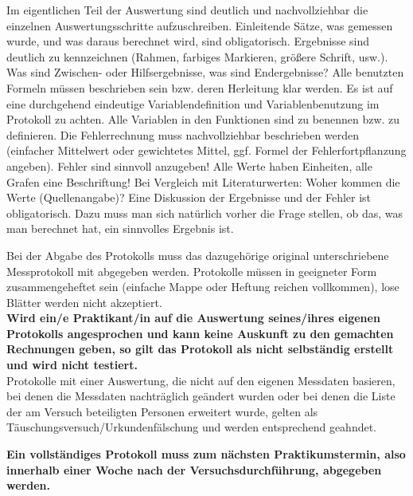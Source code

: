 Im eigentlichen Teil der Auswertung sind deutlich und nachvollziehbar die einzelnen Auswertungsschritte aufzuschreiben. Einleitende Sätze, was gemessen wurde, und was daraus berechnet wird, sind obligatorisch. Ergebnisse sind deutlich zu kennzeichnen (Rahmen, farbiges Markieren, größere Schrift, usw.). Was sind Zwischen- oder Hilfsergebnisse, was sind Endergebnisse? Alle benutzten Formeln müssen beschrieben sein bzw. deren Herleitung klar werden. Es ist auf eine durchgehend eindeutige Variablendefinition und Variablenbenutzung im Protokoll zu achten. Alle Variablen in den Funktionen sind zu benennen bzw. zu definieren. Die Fehlerrechnung muss nachvollziehbar beschrieben werden (einfacher Mittelwert oder gewichtetes Mittel, ggf. Formel der Fehlerfortpflanzung angeben). Fehler sind sinnvoll anzugeben! Alle Werte haben Einheiten, alle Grafen eine Beschriftung! Bei Vergleich mit Literaturwerten: Woher kommen die Werte (Quellenangabe)? Eine Diskussion der Ergebnisse und der Fehler ist obligatorisch. Dazu muss man sich natürlich vorher die Frage stellen, ob das, was man berechnet hat, ein sinnvolles Ergebnis ist.

Bei der Abgabe des Protokolls muss das dazugehörige original unterschriebene Messprotokoll mit abgegeben werden. Protokolle müssen in geeigneter Form zusammengeheftet sein (einfache Mappe oder Heftung reichen vollkommen), lose Blätter werden nicht akzeptiert.\\
\textbf{Wird ein/e Praktikant/in auf die Auswertung seines/ihres eigenen Protokolls angesprochen und kann keine Auskunft zu den gemachten Rechnungen geben, so gilt das Protokoll als nicht selbständig erstellt und wird nicht testiert.} \\
Protokolle mit einer Auswertung, die nicht auf den eigenen Messdaten basieren, bei denen die Messdaten nachträglich geändert wurden oder bei denen die Liste der am Versuch beteiligten Personen erweitert wurde, gelten als Täuschungsversuch/Urkundenfälschung und werden entsprechend geahndet.
%
%

{\bf Ein vollständiges Protokoll muss zum nächsten Praktikumstermin, also innerhalb einer Woche nach der Versuchsdurchführung, abgegeben werden.} 

